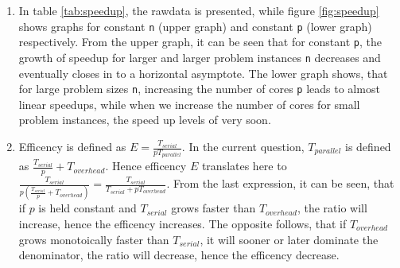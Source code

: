 \documentclass[a4paper,11pt,twoside]{article}
\begin{document}
\begin{enumerate}[label={\alph*)}]
\item In table \ref{tab:speedup}, the rawdata is presented, while figure \ref{fig:speedup} shows graphs for constant \verb+n+ (upper graph) and constant \verb+p+ (lower graph) respectively. From the upper graph, it can be seen that for constant \verb+p+, the growth of speedup for larger and larger problem instances \verb+n+ decreases and eventually closes in to a horizontal asymptote. The lower graph shows, that for large problem sizes \verb+n+, increasing the number of cores \verb+p+ leads to almost linear speedups, while when we increase the number of cores for small problem instances, the speed up levels of very soon.    

\item Efficency is defined as $E = \frac{T_{serial}}{pT_{parallel}}$. In the current question, $T_{parallel}$ is defined as $\frac{T_{serial}}{p}+T_{overhead}$. Hence efficency $E$ translates here to $\frac{T_{serial}}{p(\frac{T_{serial}}{p}+T_{overhead})} = \frac{T_{serial}}{T_{serial}+pT_{overhead}}$. From the last expression, it can be seen, that if $p$ is held constant and $T_{serial}$ grows faster than $T_{overhead}$, the ratio will increase, hence the efficency increases.
The opposite follows, that if $T_{overhead}$ grows monotoically faster than $T_{serial}$, it will sooner or later dominate the denominator, the ratio will decrease, hence the efficency decrease.
  
\end{enumerate}
\end{document}
